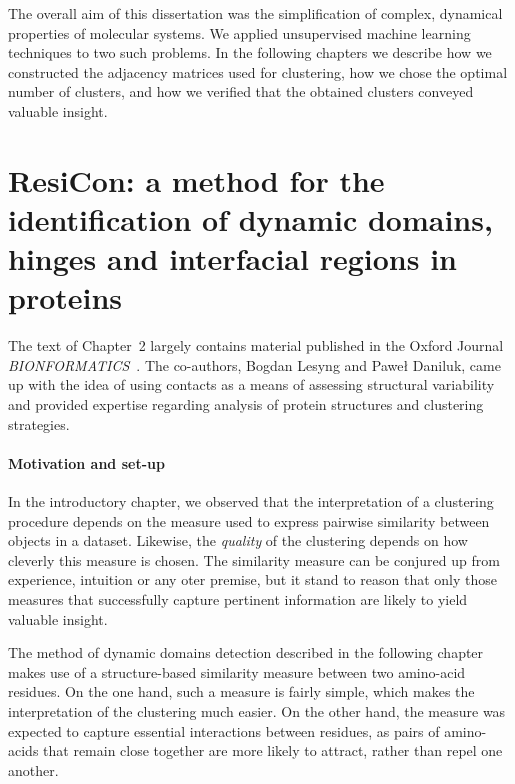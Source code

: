 \documentclass[a4paper,11pt,twoside]{book}%
\begin{document}
The overall aim of this dissertation was the simplification of complex, dynamical properties of molecular systems.
We applied unsupervised machine learning techniques to two such problems.
In the following chapters we describe how we constructed the adjacency matrices used for clustering, how we chose the optimal number of clusters, and how we verified that the obtained clusters conveyed valuable insight.



\newcommand{\angstrom}{\mbox{\normalfont\AA}}
\newcommand{\myHeight}{0.13}
\renewcommand{\arraystretch}{1.9} %

\chapter{ResiCon: a method for the identification of dynamic domains, hinges and interfacial regions in proteins}

The text of Chapter~2 largely contains material published in the Oxford Journal \emph{BIONFORMATICS}~\cite{dziubinski2016resicon}. 
The co-authors, Bogdan Lesyng and Pawe\l{} Daniluk, came up with the idea of using contacts as a means of assessing structural variability and provided expertise regarding analysis of protein structures and clustering strategies.

\subsubsection{Motivation and set-up}

In the introductory chapter, we observed that the interpretation of a clustering procedure depends on the measure used to express pairwise similarity between objects in a dataset.
Likewise, the \emph{quality} of the clustering depends on how cleverly this measure is chosen.
The similarity measure can be conjured up from experience, intuition or any oter premise, but it stand to reason that only those measures that successfully capture pertinent information are likely to yield valuable insight.

The method of dynamic domains detection described in the following chapter makes use of a structure-based similarity measure between two amino-acid residues.
On the one hand, such a measure is fairly simple, which makes the interpretation of the clustering much easier.
On the other hand, the measure was expected to capture essential interactions between residues, as pairs of amino-acids that remain close together are more likely to attract, rather than repel one another.
\end{document}

